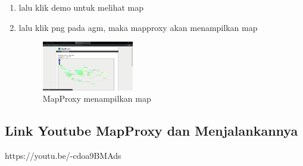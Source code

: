 \begin{enumerate}
  \item lalu klik demo untuk melihat map
  \item lalu klik png pada agm, maka mapproxy akan menampilkan map
  \hfill\break
  \begin{figure}[H]
  \includegraphics[width=4cm]{figures/tugas4/1174067/10.png}
  \centering
  \caption{MapProxy menampilkan map}
  \end{figure}

\end{enumerate}

\subsection{Link Youtube MapProxy dan Menjalankannya}
https://youtu.be/-cdoa9BMAds


